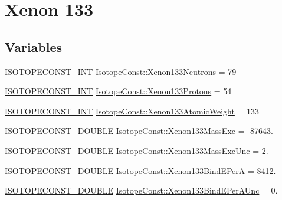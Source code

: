 \hypertarget{group___isotope_const-_xenon-_xe133}{}\section{Xenon 133}
\label{group___isotope_const-_xenon-_xe133}
\subsection*{Variables}
\begin{DoxyCompactItemize}
\item 
\mbox{\hyperlink{group___isotope_const-_macros_ga5f18360b3e99483a35c32d789e62621c}{I\+S\+O\+T\+O\+P\+E\+C\+O\+N\+S\+T\+\_\+\+I\+NT}} \mbox{\hyperlink{group___isotope_const-_xenon-_xe133_ga8e076c5656e96c699cc27b88fc38d193}{Isotope\+Const\+::\+Xenon133\+Neutrons}} = 79
\item 
\mbox{\hyperlink{group___isotope_const-_macros_ga5f18360b3e99483a35c32d789e62621c}{I\+S\+O\+T\+O\+P\+E\+C\+O\+N\+S\+T\+\_\+\+I\+NT}} \mbox{\hyperlink{group___isotope_const-_xenon-_xe133_ga6c74f6fad2b8b1072f1334ca5ab414ff}{Isotope\+Const\+::\+Xenon133\+Protons}} = 54
\item 
\mbox{\hyperlink{group___isotope_const-_macros_ga5f18360b3e99483a35c32d789e62621c}{I\+S\+O\+T\+O\+P\+E\+C\+O\+N\+S\+T\+\_\+\+I\+NT}} \mbox{\hyperlink{group___isotope_const-_xenon-_xe133_ga3973b866c1d0907124c292b8f1f1c8be}{Isotope\+Const\+::\+Xenon133\+Atomic\+Weight}} = 133
\item 
\mbox{\hyperlink{group___isotope_const-_macros_ga8f45a7272ce02c0b4c65c44636ed719a}{I\+S\+O\+T\+O\+P\+E\+C\+O\+N\+S\+T\+\_\+\+D\+O\+U\+B\+LE}} \mbox{\hyperlink{group___isotope_const-_xenon-_xe133_ga1f2e5ea55d2f6835b3f0648e885f8976}{Isotope\+Const\+::\+Xenon133\+Mass\+Exc}} = -\/87643.
\item 
\mbox{\hyperlink{group___isotope_const-_macros_ga8f45a7272ce02c0b4c65c44636ed719a}{I\+S\+O\+T\+O\+P\+E\+C\+O\+N\+S\+T\+\_\+\+D\+O\+U\+B\+LE}} \mbox{\hyperlink{group___isotope_const-_xenon-_xe133_ga17116b0e9744697fe2f1b967614d9ff2}{Isotope\+Const\+::\+Xenon133\+Mass\+Exc\+Unc}} = 2.
\item 
\mbox{\hyperlink{group___isotope_const-_macros_ga8f45a7272ce02c0b4c65c44636ed719a}{I\+S\+O\+T\+O\+P\+E\+C\+O\+N\+S\+T\+\_\+\+D\+O\+U\+B\+LE}} \mbox{\hyperlink{group___isotope_const-_xenon-_xe133_ga47b5bd436b9c539fd3aa243d3d9e9c89}{Isotope\+Const\+::\+Xenon133\+Bind\+E\+PerA}} = 8412.
\item 
\mbox{\hyperlink{group___isotope_const-_macros_ga8f45a7272ce02c0b4c65c44636ed719a}{I\+S\+O\+T\+O\+P\+E\+C\+O\+N\+S\+T\+\_\+\+D\+O\+U\+B\+LE}} \mbox{\hyperlink{group___isotope_const-_xenon-_xe133_ga337993131993574bc3de4aa47418bae9}{Isotope\+Const\+::\+Xenon133\+Bind\+E\+Per\+A\+Unc}} = 0.

\end{DoxyCompactItemize}
